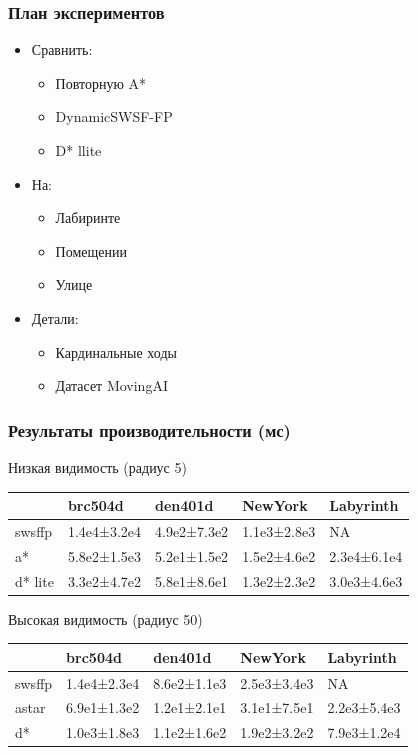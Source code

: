 \documentclass{beamer}
\begin{document}
    \begin{frame}
        \frametitle{План экспериментов}
        \begin{itemize}
            \item Сравнить:
            \begin{itemize}
                \item Повторную A*
                \item DynamicSWSF-FP
                \item D* llite
            \end{itemize}
            \item На:
            \begin{itemize}
                \item Лабиринте
                \item Помещении
                \item Улице
            \end{itemize}
            \item Детали:
            \begin{itemize}
                \item Кардинальные ходы
                \item Датасет MovingAI
            \end{itemize}
        \end{itemize}
    \end{frame}

    \begin{frame}
        \frametitle{Результаты производительности (мс)}
        Низкая видимость (радиус 5)

        \begin{tabular}{lllll}
            \hline
            & brc504d     & den401d     & NewYork     & Labyrinth   \\
            \hline
            swsffp  & 1.4e4±3.2e4 & 4.9e2±7.3e2 & 1.1e3±2.8e3 & NA          \\
            a*      & 5.8e2±1.5e3 & 5.2e1±1.5e2 & 1.5e2±4.6e2 & 2.3e4±6.1e4 \\
            d* lite & 3.3e2±4.7e2 & 5.8e1±8.6e1 & 1.3e2±2.3e2 & 3.0e3±4.6e3 \\
            \hline
        \end{tabular}

        \bigskip
        Высокая видимость (радиус 50)

        \begin{tabular}{lllll}
            \hline
            & brc504d     & den401d     & NewYork     & Labyrinth   \\
            \hline
            swsffp & 1.4e4±2.3e4 & 8.6e2±1.1e3 & 2.5e3±3.4e3 & NA          \\
            astar  & 6.9e1±1.3e2 & 1.2e1±2.1e1 & 3.1e1±7.5e1 & 2.2e3±5.4e3 \\
            d*     & 1.0e3±1.8e3 & 1.1e2±1.6e2 & 1.9e2±3.2e2 & 7.9e3±1.2e4 \\
            \hline
        \end{tabular}

    \end{frame}
\end{document}

